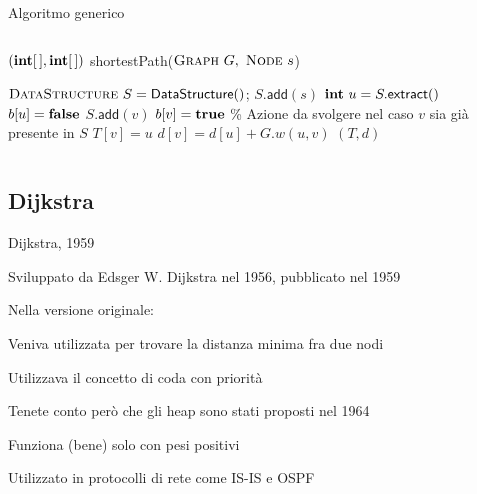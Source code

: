 \begin{frame}{Algoritmo generico}

\vspace{-24pt}
\begin{columns}
\small
\begin{Procedure}
\caption[A]{$(\INTARRAY, \INTARRAY)$ \textsf{shortestPath}($\textsc{Graph}\ G,\ \textsc{Node}\ s$)}
\alert{$\textsc{DataStructure}\ S = \textsf{DataStructure}()$; $S.\textsf{add}(s)$}\;
{
  \alert{$\INTEGER\ u = S.\textsf{extract}()$}\;
  $b[u] = \FALSE$\;
  {
    {
      {
        \alert{$S.\textsf{add}(v)$}\;
                $b[v] = \TRUE$\;
      }
      {
        \alert{\% Azione da svolgere nel caso $v$ sia già presente in $S$}
      }
      $T[v] = u$\;
      $d[v] = d[u] + G.w(u,v)$\;
    }
  }
}
\Return $(T,d)$
\end{Procedure}
\end{columns}

\end{frame}

\subsection{Dijkstra}


\begin{frame}{Dijkstra, 1959}

\vspace{-9pt}
\begin{myboxtitle}[Storia]
\BIL
\item Sviluppato da Edsger W. Dijkstra nel 1956, pubblicato nel 1959
\item Nella versione originale:
  \BI
  \item Veniva utilizzata per trovare la distanza minima fra due nodi
  \item Utilizzava il concetto di coda con priorità
  \item Tenete conto però che gli heap sono stati proposti nel 1964
  \EI
\EIL
\end{myboxtitle}

\begin{myboxtitle}[Note]
\BIL
\item Funziona (bene) solo con pesi positivi
\item Utilizzato in protocolli di rete come IS-IS e OSPF
\EIL
\end{myboxtitle}

\end{frame}



